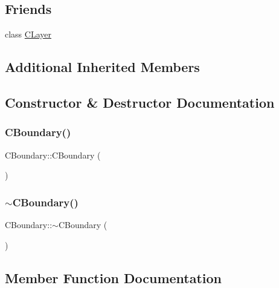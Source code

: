 \subsection*{Friends}
\begin{DoxyCompactItemize}
\item 
class \mbox{\hyperlink{classCBoundary_a7cc4d31573956cc6792fa6757cc49219}{C\+Layer}}
\end{DoxyCompactItemize}
\subsection*{Additional Inherited Members}


\subsection{Constructor \& Destructor Documentation}
\mbox{\label{classCBoundary_a135f0608ca8f6844a4fbcdf3865ada19}} 
\subsubsection{\texorpdfstring{CBoundary()}{CBoundary()}}
{\footnotesize\ttfamily C\+Boundary\+::\+C\+Boundary (\begin{DoxyParamCaption}{ }\end{DoxyParamCaption})}

\mbox{\label{classCBoundary_a6a01f673f30be7b33de734dc36df7797}} 
\subsubsection{\texorpdfstring{$\sim$CBoundary()}{~CBoundary()}}
{\footnotesize\ttfamily C\+Boundary\+::$\sim$\+C\+Boundary (\begin{DoxyParamCaption}{ }\end{DoxyParamCaption})\hspace{0.3cm}{\ttfamily [virtual]}}



\subsection{Member Function Documentation}
\mbox{\label{classCBoundary_afbfef3747d340a2a8561c24a9830935a}} 
